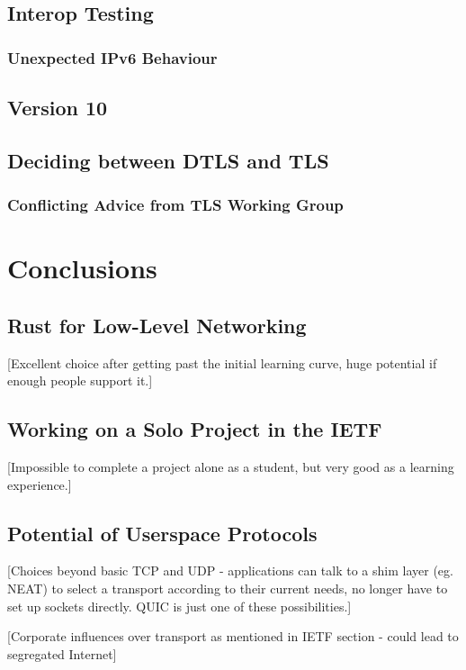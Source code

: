 \documentclass{l4proj}
\begin{document}
\section{Interop Testing}
\subsection{Unexpected IPv6 Behaviour}

\section{Version 10}

\section{Deciding between DTLS and TLS}

\subsection{Conflicting Advice from TLS Working Group}


\pagebreak


\chapter{Conclusions}
\section{Rust for Low-Level Networking}
[Excellent choice after getting past the initial learning curve, huge potential if enough people support it.]

\section{Working on a Solo Project in the IETF}
[Impossible to complete a project alone as a student, but very good as a learning experience.]

\section{Potential of Userspace Protocols}
[Choices beyond basic TCP and UDP - applications can talk to a shim layer (eg. NEAT) to select a transport according to their current needs, no longer have to set up sockets directly. QUIC is just one of these possibilities.]

[Corporate influences over transport as mentioned in IETF section - could lead to segregated Internet]
\end{document}
